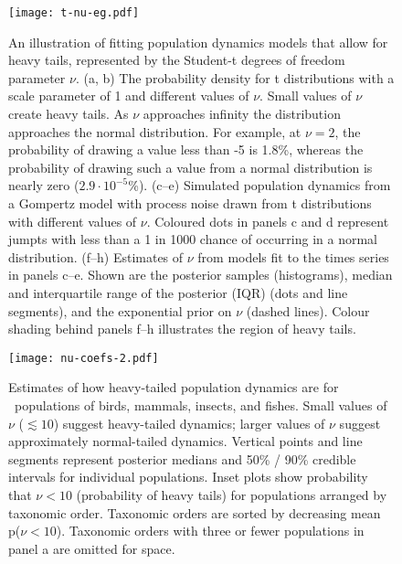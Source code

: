 \documentclass[11pt]{article}
\begin{document}
\begin{figure}[htbp]
\begin{center}
\texttt{[image: t-nu-eg.pdf]}
\caption{An illustration of fitting population dynamics models that allow for heavy tails, represented by the Student-t degrees of freedom parameter $\nu$.
  (a, b) The probability density for t distributions with a scale parameter of 1 and different values of $\nu$.
  Small values of $\nu$ create heavy tails.
  As $\nu$ approaches infinity the distribution approaches the normal distribution.
  For example, at $\nu = 2$, the probability of drawing a value less than -5 is 1.8\%, whereas the probability of drawing such a value from a normal distribution is nearly zero ($2.9\cdot10^{-5}$\%).
  (c--e) Simulated population dynamics from a Gompertz model with process noise drawn from t distributions with different values of $\nu$.  
  Coloured dots in panels c and d represent jumpts with less than a 1 in 1000 chance of occurring in a normal distribution.
  (f--h) Estimates of $\nu$ from models fit to the times series in panels c--e.
  Shown are the posterior samples (histograms), median and interquartile range of the posterior (IQR) (dots and line segments), and the exponential prior on $\nu$ (dashed lines).
  Colour shading behind panels f--h illustrates the region of heavy tails.}
\label{fig:didactic}
\end{center}
\end{figure}

\clearpage

\begin{figure}[htbp]
\begin{center}
\texttt{[image: nu-coefs-2.pdf]}
\caption{
Estimates of how heavy-tailed population dynamics are for \nuCoefPopN\ populations of birds, mammals, insects, and fishes. Small values of $\nu$ ($\lesssim 10$) suggest heavy-tailed dynamics; larger values of $\nu$ suggest approximately normal-tailed dynamics. Vertical points and line segments represent posterior medians and 50\% / 90\% credible intervals for individual populations. Inset plots show probability that $\nu < 10$ (probability of heavy tails) for populations arranged by taxonomic order. Taxonomic orders are sorted by decreasing mean p($\nu < 10$).
Taxonomic orders with three or fewer populations in panel a are omitted for space.}\label{fig:nu-coefs}
\end{center}
\end{figure}

\clearpage
\end{document}
